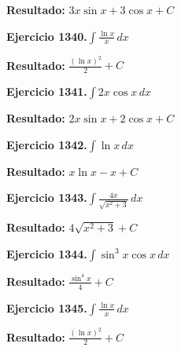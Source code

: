 \documentclass[10pt,a4paper]{article}
\begin{document}
\begin{solbox}
\textbf{Resultado:} \(\displaystyle 3x\sin x + 3\cos x + C\)
\end{solbox}

\begin{ejbox}
\textbf{Ejercicio 1340.}\quad $\int \frac{\ln x}{x}\,dx$
\end{ejbox}

\begin{solbox}
\textbf{Resultado:} \(\displaystyle \frac{(\ln x)^2}{2} + C\)
\end{solbox}

\begin{ejbox}
\textbf{Ejercicio 1341.}\quad $\int 2x \cos x\,dx$
\end{ejbox}

\begin{solbox}
\textbf{Resultado:} \(\displaystyle 2x\sin x + 2\cos x + C\)
\end{solbox}

\newpage
\begin{ejbox}
\textbf{Ejercicio 1342.}\quad $\int \ln x\,dx$
\end{ejbox}

\begin{solbox}
\textbf{Resultado:} \(\displaystyle x\ln x - x + C\)
\end{solbox}

\begin{ejbox}
\textbf{Ejercicio 1343.}\quad $\int \frac{4x}{\sqrt{x^2+3}}\,dx$
\end{ejbox}

\begin{solbox}
\textbf{Resultado:} \(\displaystyle 4\sqrt{x^2+3} + C\)
\end{solbox}

\begin{ejbox}
\textbf{Ejercicio 1344.}\quad $\int \sin^{3}x \cos x\,dx$
\end{ejbox}

\begin{solbox}
\textbf{Resultado:} \(\displaystyle \frac{\sin^{4}x}{4} + C\)
\end{solbox}

\newpage
\begin{ejbox}
\textbf{Ejercicio 1345.}\quad $\int \frac{\ln x}{x}\,dx$
\end{ejbox}

\begin{solbox}
\textbf{Resultado:} \(\displaystyle \frac{(\ln x)^2}{2} + C\)
\end{solbox}
\end{document}

